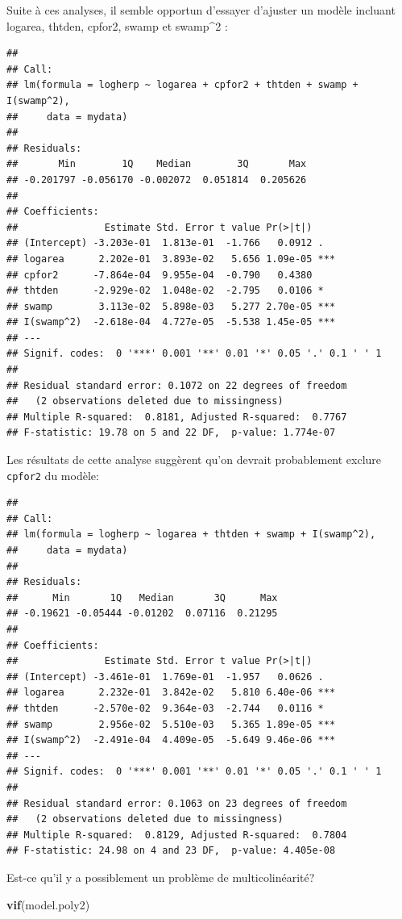 \documentclass[12pt,]{book}
\newenvironment{Shaded}{\begin{snugshade}}{\end{snugshade}}
\newcommand{\KeywordTok}[1]{\textcolor[rgb]{0.13,0.29,0.53}{\textbf{#1}}}
\newcommand{\NormalTok}[1]{#1}
\begin{document}
Suite à ces analyses, il semble opportun d'essayer d'ajuster un modèle incluant logarea, thtden, cpfor2, swamp et swamp\^{}2 :

\begin{verbatim}
## 
## Call:
## lm(formula = logherp ~ logarea + cpfor2 + thtden + swamp + I(swamp^2), 
##     data = mydata)
## 
## Residuals:
##       Min        1Q    Median        3Q       Max 
## -0.201797 -0.056170 -0.002072  0.051814  0.205626 
## 
## Coefficients:
##               Estimate Std. Error t value Pr(>|t|)    
## (Intercept) -3.203e-01  1.813e-01  -1.766   0.0912 .  
## logarea      2.202e-01  3.893e-02   5.656 1.09e-05 ***
## cpfor2      -7.864e-04  9.955e-04  -0.790   0.4380    
## thtden      -2.929e-02  1.048e-02  -2.795   0.0106 *  
## swamp        3.113e-02  5.898e-03   5.277 2.70e-05 ***
## I(swamp^2)  -2.618e-04  4.727e-05  -5.538 1.45e-05 ***
## ---
## Signif. codes:  0 '***' 0.001 '**' 0.01 '*' 0.05 '.' 0.1 ' ' 1
## 
## Residual standard error: 0.1072 on 22 degrees of freedom
##   (2 observations deleted due to missingness)
## Multiple R-squared:  0.8181, Adjusted R-squared:  0.7767 
## F-statistic: 19.78 on 5 and 22 DF,  p-value: 1.774e-07
\end{verbatim}

Les résultats de cette analyse suggèrent qu'on devrait probablement exclure \texttt{cpfor2} du modèle:

\begin{verbatim}
## 
## Call:
## lm(formula = logherp ~ logarea + thtden + swamp + I(swamp^2), 
##     data = mydata)
## 
## Residuals:
##      Min       1Q   Median       3Q      Max 
## -0.19621 -0.05444 -0.01202  0.07116  0.21295 
## 
## Coefficients:
##               Estimate Std. Error t value Pr(>|t|)    
## (Intercept) -3.461e-01  1.769e-01  -1.957   0.0626 .  
## logarea      2.232e-01  3.842e-02   5.810 6.40e-06 ***
## thtden      -2.570e-02  9.364e-03  -2.744   0.0116 *  
## swamp        2.956e-02  5.510e-03   5.365 1.89e-05 ***
## I(swamp^2)  -2.491e-04  4.409e-05  -5.649 9.46e-06 ***
## ---
## Signif. codes:  0 '***' 0.001 '**' 0.01 '*' 0.05 '.' 0.1 ' ' 1
## 
## Residual standard error: 0.1063 on 23 degrees of freedom
##   (2 observations deleted due to missingness)
## Multiple R-squared:  0.8129, Adjusted R-squared:  0.7804 
## F-statistic: 24.98 on 4 and 23 DF,  p-value: 4.405e-08
\end{verbatim}

Est-ce qu'il y a possiblement un problème de multicolinéarité?

\begin{Shaded}
\begin{Highlighting}[]
\KeywordTok{vif}\NormalTok{(model.poly2)}
\end{Highlighting}
\end{Shaded}
\end{document}
